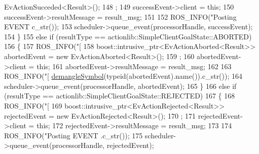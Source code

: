\begin{DoxyCode}
{{{{{      EvActionSucceded<Result>();
148                     ;
149                     successEvent->client = \textcolor{keyword}{this};
150                     successEvent->resultMessage = result\_msg;
151 
152                     ROS\_INFO(\textcolor{stringliteral}{"Posting EVENT %
      c\_str());
153                     scheduler->queue\_event(processorHandle, successEvent);
154                 \}
155                 \textcolor{keywordflow}{else} \textcolor{keywordflow}{if} (resultType == actionlib::SimpleClientGoalState::ABORTED)
156                 \{
157                     ROS\_INFO(\textcolor{stringliteral}{"[%
158                     boost::intrusive\_ptr<EvActionAborted<Result>> abortedEvent = \textcolor{keyword}{new} 
      EvActionAborted<Result>();
159                     ;
160                     abortedEvent->client = \textcolor{keyword}{this};
161                     abortedEvent->resultMessage = result\_msg;
162 
163                     ROS\_INFO(\textcolor{stringliteral}{"[%
      \hyperlink{common_8h_a401d7e4f000fd4246a20be1e7d5ec2fc}{demangleSymbol}(\textcolor{keyword}{typeid}(abortedEvent).name()).c\_str());
164                     scheduler->queue\_event(processorHandle, abortedEvent);
165                 \}
166                 \textcolor{keywordflow}{else} \textcolor{keywordflow}{if} (resultType == actionlib::SimpleClientGoalState::REJECTED)
167                 \{
168                     ROS\_INFO(\textcolor{stringliteral}{"[%
169                     boost::intrusive\_ptr<EvActionRejected<Result>> rejectedEvent = \textcolor{keyword}{new} 
      EvActionRejected<Result>();
170                     ;
171                     rejectedEvent->client = \textcolor{keyword}{this};
172                     rejectedEvent->resultMessage = result\_msg;
173 
174                     ROS\_INFO(\textcolor{stringliteral}{"Posting EVENT %
      .c\_str());
175                     scheduler->queue\_event(processorHandle, rejectedEvent);
}}}}}}}}}}
\end{DoxyCode}
